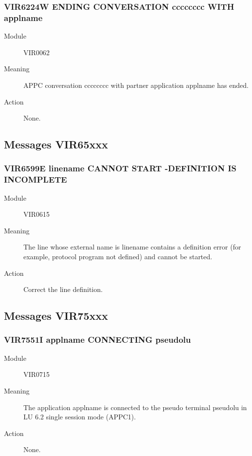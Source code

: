 \documentclass[letterpaper,10pt,english]{sphinxmanual}
\begin{document}
\subsubsection{VIR6224W ENDING CONVERSATION cccccccc WITH applname}
\label{\detokenize{messages:vir6224w-ending-conversation-cccccccc-with-applname}}\begin{description}
\item[{Module}] \leavevmode
VIR0062

\item[{Meaning}] \leavevmode
APPC conversation cccccccc with partner application applname has ended.

\item[{Action}] \leavevmode
None.

\end{description}


\subsection{Messages VIR65xxx}
\label{\detokenize{messages:messages-vir65xxx}}

\subsubsection{VIR6599E linename CANNOT START -DEFINITION IS INCOMPLETE}
\label{\detokenize{messages:vir6599e-linename-cannot-start-definition-is-incomplete}}\begin{description}
\item[{Module}] \leavevmode
VIR0615

\item[{Meaning}] \leavevmode
The line whose external name is linename contains a definition error (for example, protocol program not defined) and cannot be started.

\item[{Action}] \leavevmode
Correct the line definition.

\end{description}


\subsection{Messages VIR75xxx}
\label{\detokenize{messages:messages-vir75xxx}}

\subsubsection{VIR7551I applname CONNECTING pseudolu}
\label{\detokenize{messages:vir7551i-applname-connecting-pseudolu}}\begin{description}
\item[{Module}] \leavevmode
VIR0715

\item[{Meaning}] \leavevmode
The application applname is connected to the pseudo terminal pseudolu in LU 6.2 single session mode (APPC1).

\item[{Action}] \leavevmode
None.

\end{description}
\end{document}
